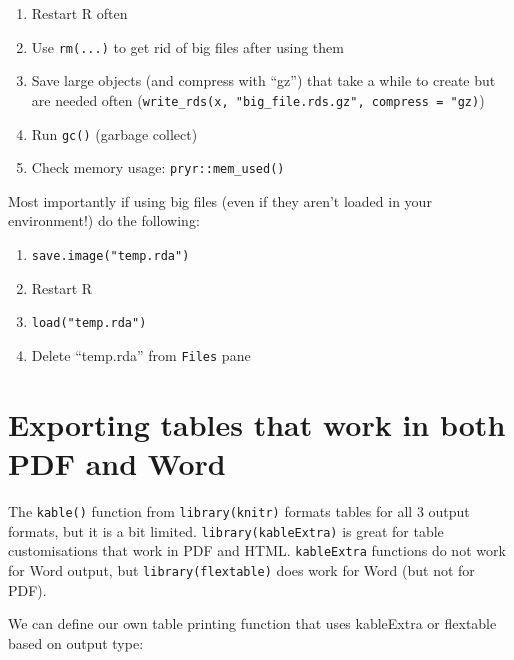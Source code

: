 \documentclass[
]{book}
\providecommand{\tightlist}{%
  \setlength{\itemsep}{0pt}\setlength{\parskip}{0pt}}
\begin{document}
\begin{enumerate}
\def\labelenumi{\arabic{enumi}.}
\tightlist
\item
  Restart R often
\item
  Use \texttt{rm(...)} to get rid of big files after using them
\item
  Save large objects (and compress with ``gz'') that take a while to create but are needed often (\texttt{write\_rds(x,\ "big\_file.rds.gz",\ compress\ =\ "gz)})
\item
  Run \texttt{gc()} (garbage collect)
\item
  Check memory usage: \texttt{pryr::mem\_used()}
\end{enumerate}

Most importantly if using big files (even if they aren't loaded in your environment!) do the following:

\begin{enumerate}
\def\labelenumi{\arabic{enumi}.}
\tightlist
\item
  \texttt{save.image("temp.rda")}
\item
  Restart R
\item
  \texttt{load("temp.rda")}
\item
  Delete ``temp.rda'' from \texttt{Files} pane
\end{enumerate}

\hypertarget{exporting-tables-that-work-in-both-pdf-and-word}{%
\section{Exporting tables that work in both PDF and Word}\label{exporting-tables-that-work-in-both-pdf-and-word}}

The \texttt{kable()} function from \texttt{library(knitr)} formats tables for all 3 output formats, but it is a bit limited.
\texttt{library(kableExtra)} is great for table customisations that work in PDF and HTML.
\texttt{kableExtra} functions do not work for Word output, but \texttt{library(flextable)} does work for Word (but not for PDF).

We can define our own table printing function that uses kableExtra or flextable based on output type:
\end{document}
